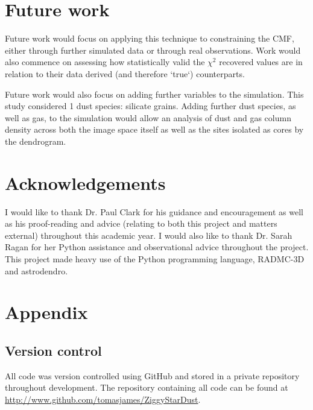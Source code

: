 \documentclass{report}
\begin{document}

\chapter{Future work}
Future work would focus on applying this technique to constraining the CMF, either through further simulated data or through real observations. Work would also commence on assessing how statistically valid the $\chi^{2}$ recovered values are in relation to their data derived (and therefore `true`) counterparts.

Future work would also focus on adding further variables to the simulation. This study considered 1 dust species: silicate grains. Adding further dust species, as well as gas, to the simulation would allow an analysis of dust and gas column density across both the image space itself as well as the sites isolated as cores by the dendrogram.


\chapter{Acknowledgements}
I would like to thank Dr. Paul Clark for his guidance and encouragement as well as his proof-reading and advice (relating to both this project and matters external) throughout this academic year. I would also like to thank Dr. Sarah Ragan for her Python assistance and observational advice throughout the project. This project made heavy use of the Python programming language, RADMC-3D and astrodendro.


\chapter{Appendix}

\section*{Version control}
All code was version controlled using GitHub and stored in a private repository throughout development. The repository containing all code can be found at \href{http://www.github.com/tomasjames/ZiggyStarDust}{http://www.github.com/tomasjames/ZiggyStarDust}.
\end{document}
